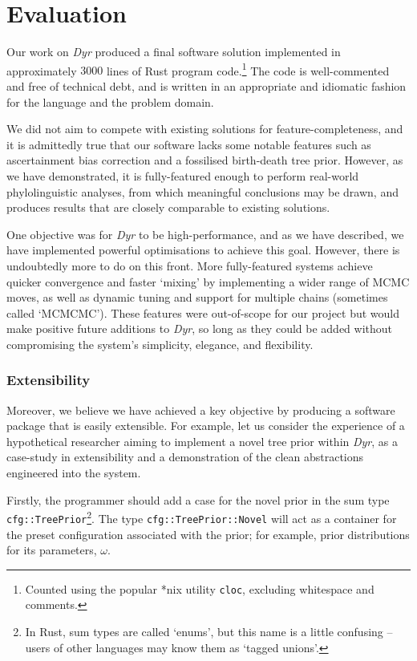 \documentclass[10pt,journal,compsoc]{IEEEtran}
\begin{document}
\section{Evaluation}

Our work on \textit{Dyr} produced a final software solution implemented in approximately $3000$ lines of Rust program code.\footnote{Counted using the popular *nix utility \texttt{cloc}, excluding whitespace and comments.} The code is well-commented and free of technical debt, and is written in an appropriate and idiomatic fashion for the language and the problem domain.

We did not aim to compete with existing solutions for feature-completeness, and it is admittedly true that our software lacks some notable features such as ascertainment bias correction and a fossilised birth-death tree prior. However, as we have demonstrated, it is fully-featured enough to perform real-world phylolinguistic analyses, from which meaningful conclusions may be drawn, and produces results that are closely comparable to existing solutions.

One objective was for \textit{Dyr} to be high-performance, and as we have described, we have implemented powerful optimisations to achieve this goal. However, there is undoubtedly more to do on this front. More fully-featured systems achieve quicker convergence and faster `mixing' by implementing a wider range of MCMC moves, as well as dynamic tuning and support for multiple chains (sometimes called `MCMCMC')\cite{ronquist2012mrbayes}. These features were out-of-scope for our project but would make positive future additions to \textit{Dyr}, so long as they could be added without compromising the system's simplicity, elegance, and flexibility.

\subsubsection{Extensibility}
Moreover, we believe we have achieved a key objective by producing a software package that is easily extensible. For example, let us consider the experience of a hypothetical researcher aiming to implement a novel tree prior within \textit{Dyr}, as a case-study in extensibility and a demonstration of the clean abstractions engineered into the system.

Firstly, the programmer should add a case for the novel prior in the sum type \texttt{cfg::TreePrior}\footnote{In Rust, sum types are called `enums', but this name is a little confusing -- users of other languages may know them as `tagged unions'.}. The type \texttt{cfg::TreePrior::Novel} will act as a container for the preset configuration associated with the prior; for example, prior distributions for its parameters, $\omega$.
\end{document}
